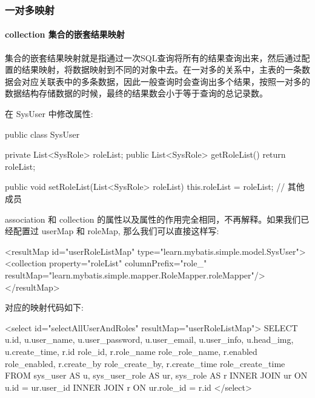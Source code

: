 \subsubsection{一对多映射}

\paragraph*{collection 集合的嵌套结果映射}

集合的嵌套结果映射就是指通过一次SQL查询将所有的结果查询出来，然后通过配置的结果映射，将数据映射到不同的对象中去。在一对多的关系中，主表的一条数据会对应关联表中的多条数据，因此一般查询时会查询出多个结果，按照一对多的数据结构存储数据的时候，最终的结果数会小于等于查询的总记录数。

在 SysUser 中修改属性:

\begin{Java}
public class SysUser {
    private List<SysRole> roleList;
    public List<SysRole> getRoleList() {
        return roleList;
    }

    public void setRoleList(List<SysRole> roleList) {
        this.roleList = roleList;
    }
    // 其他成员
}
\end{Java}

association 和 collection 的属性以及属性的作用完全相同，不再解释。如果我们已经配置过 userMap 和 roleMap, 那么我们可以直接这样写:

\begin{xml}
<resultMap id="userRoleListMap" type="learn.mybatis.simple.model.SysUser">
    <collection property="roleList" columnPrefix="role_" resultMap="learn.mybatis.simple.mapper.RoleMapper.roleMapper"/>
</resultMap>
\end{xml}

对应的映射代码如下:

\begin{xml}
<select id="selectAllUserAndRoles" resultMap="userRoleListMap">
    SELECT u.id,
           u.user_name,
           u.user_password,
           u.user_email,
           u.user_info,
           u.head_img,
           u.create_time,
           r.id          role_id,
           r.role_name   role_role_name,
           r.enabled     role_enabled,
           r.create_by   role_create_by,
           r.create_time role_create_time
    FROM sys_user AS u,
         sys_user_role AS ur,
         sys_role AS r
             INNER JOIN ur ON u.id = ur.user_id
             INNER JOIN r ON ur.role_id = r.id
</select>
\end{xml}

